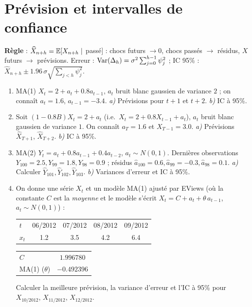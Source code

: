 \documentclass[11pt]{article}
\begin{document}
\section{Prévision et intervalles de confiance}
\begin{contexte}
\textbf{Règle} : $\widehat X_{n+h}=\mathbb{E}[X_{n+h}\mid$ passé$]$ : chocs futurs $\to0$, chocs
passés $\to$ résidus, $X$ futurs $\to$ prévisions. Erreur :
$\operatorname{Var}(\Delta_h)=\sigma^2\sum_{j=0}^{h-1}\psi_j^2$ ; IC 95\% :
$\widehat X_{n+h}\pm1.96\,\sigma\sqrt{\sum_{j<h}\psi_j^2}$.
\end{contexte}
\begin{enumerate}[label=\textbf{Q\,E.\arabic*},leftmargin=*]
\item MA(1) $X_t=2+a_t+0.8a_{t-1}$, $a_t$ bruit blanc gaussien de variance $2$ ; on connaît
$a_t=1.6$, $a_{t-1}=-3.4$. \emph{a)} Prévisions pour $t+1$ et $t+2$. \emph{b)} IC à 95\%.

\item Soit $(1-0.8B)X_t=2+a_t$ (i.e.\ $X_t=2+0.8X_{t-1}+a_t$), $a_t$ bruit blanc gaussien de
variance $1$. On connaît $a_T=1.6$ et $X_{T-1}=3.0$. \emph{a)} Prévisions $\widehat X_{T+1}$,
$\widehat X_{T+2}$. \emph{b)} IC à 95\%.

\item MA(2) $Y_t=a_t+0.8a_{t-1}+0.4a_{t-2}$, $a_t\sim N(0,1)$. Dernières observations
$Y_{100}=2.5,Y_{99}=1.8,Y_{98}=0.9$ ; résidus $\hat a_{100}=0.6,\hat a_{99}=-0.3,\hat
a_{98}=0.1$. \emph{a)} Calculer $\widehat Y_{101},\widehat Y_{102},\widehat Y_{103}$.
\emph{b)} Variances d'erreur et IC à 95\%.

\item On donne une série $X_t$ et un modèle MA(1) ajusté par EViews (où la constante
$C$ est la \emph{moyenne} et le modèle s'écrit $X_t=C+a_t+\theta\,a_{t-1}$, $a_t\sim N(0,1)$) :
\begin{center}\small
\begin{tabular}{lcccc}\toprule
$t$ & 06/2012 & 07/2012 & 08/2012 & 09/2012\\ $x_t$ & 1.2 & 3.5 & 4.2 & 6.4\\\bottomrule
\end{tabular}\qquad
\begin{tabular}{lc}\toprule
$C$ & $1.996780$\\ MA(1) ($\theta$) & $-0.492396$\\\bottomrule
\end{tabular}
\end{center}
Calculer la meilleure prévision, la variance d'erreur et l'IC à 95\% pour $X_{10/2012}$,
$X_{11/2012}$, $X_{12/2012}$.


\end{enumerate}
\end{document}
